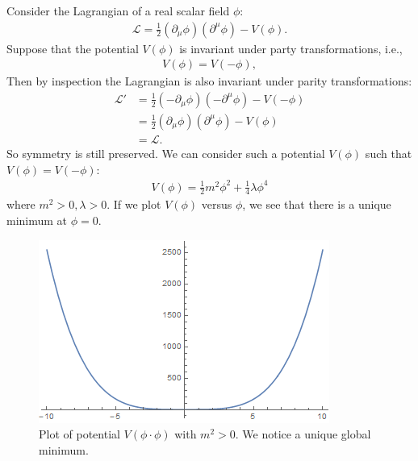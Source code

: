 \documentclass{book}
\numberwithin{equation}{section}
\theoremstyle{definition}
\newcommand{\p}{\partial}
\newcommand{\lag}{\mathcal{L}}
\begin{document}
Consider the Lagrangian of a real scalar field $\phi$:
\begin{align}
\lag = \frac{1}{2}(\p_\mu\phi)(\p^\mu\phi) - V(\phi).
\end{align}
Suppose that the potential $V(\phi)$ is invariant under party transformations, i.e.,
\begin{align}
V(\phi) = V(-\phi),
\end{align}
Then by inspection the Lagrangian is also invariant under parity transformations:
\begin{align}
\lag' &= \frac{1}{2}(-\p_\mu\phi)(-\p^\mu\phi) - V(-\phi)\\
&= \frac{1}{2}(\p_\mu\phi)(\p^\mu\phi) - V(\phi)\\
&= \lag.
\end{align}
So symmetry is still preserved. We can consider such a potential $V(\phi)$ such that $V(\phi) = V(-\phi)$:
\begin{align}
V(\phi) = \frac{1}{2}m^2\phi^2 + \frac{1}{4}\lambda\phi^4
\end{align}
where $m^2 > 0, \lambda > 0$. If we plot $V(\phi)$ versus $\phi$, we see that there is a unique minimum at $\phi = 0$. 
\begin{figure}[h!]
	\centering
	\includegraphics[scale=1]{curve2.png}
	\caption{Plot of potential $V(\phi\cdot \phi)$ with $m^2 > 0$. We notice a unique global minimum.}
\end{figure}
\end{document}
